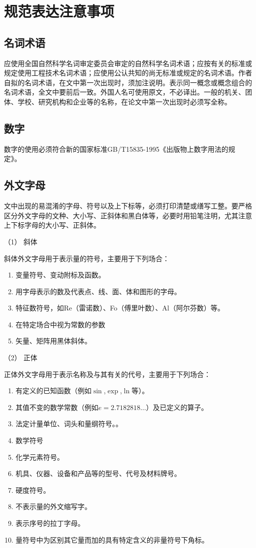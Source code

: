 \section{规范表达注意事项}
\subsection{名词术语}
应使用全国自然科学名词审定委员会审定的自然科学名词术语；应按有关的标准或规定使用工程技术名词术语；应使用公认共知的尚无标准或规定的名词术语。作者自拟的名词术语，在文中第一次出现时，须加注说明。表示同一概念或概念组合的名词术语，全文中要前后一致。外国人名可使用原文，不必译出。一般的机关、团体、学校、研究机构和企业等的名称，在论文中第一次出现时必须写全称。

\subsection{数字}
数字的使用必须符合新的国家标准GB/T15835-1995《出版物上数字用法的规定》。

\subsection{外文字母}
文中出现的易混淆的字母、符号以及上下标等，必须打印清楚或缮写工整。要严格区分外文字母的文种、大小写、正斜体和黑白体等，必要时用铅笔注明，尤其注意上下标字母的大小写、正斜体。

（1） 斜体

斜体外文字母用于表示量的符号，主要用于下列场合：

\begin{enumerate}[label=\circled{\arabic*}]
\item 变量符号、变动附标及函数。
\item 用字母表示的数及代表点、线、面、体和图形的字母。
\item 特征数符号，如Re（雷诺数）、Fo（傅里叶数）、Al（阿尔芬数）等。
\item 在特定场合中视为常数的参数
\item 矢量、矩阵用黑体斜体。
\end{enumerate}

（2） 正体

正体外文字母用于表示名称及与其有关的代号，主要用于下列场合：

\begin{enumerate}[label=\circled{\arabic*}]
\item 有定义的已知函数（例如$\sin$,$\exp$,$\ln$等）。
\item 其值不变的数学常数（例如$e=2.718 281 8…$）及已定义的算子。
\item 法定计量单位、词头和量纲符号。。
\item 数学符号
\item 化学元素符号。
\item 机具、仪器、设备和产品等的型号、代号及材料牌号。
\item 硬度符号。
\item 不表示量的外文缩写字。
\item 表示序号的拉丁字母。
\item 量符号中为区别其它量而加的具有特定含义的非量符号下角标。
\end{enumerate}

